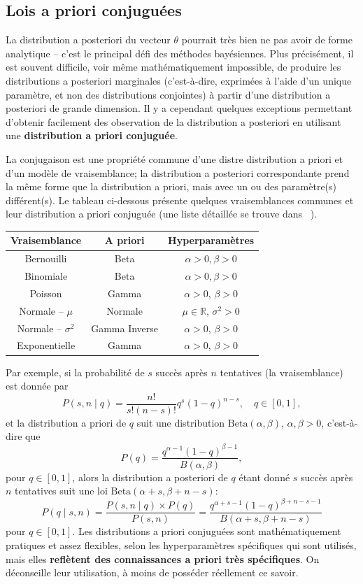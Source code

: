 \subsection{Lois a priori conjuguées}
La distribution a posteriori du vecteur $\theta$ pourrait tr\`es bien ne pas avoir de forme analytique -- c'est le principal défi des méthodes bayésiennes. \newl Plus précisément, il est souvent difficile, voir m\^eme math\'ematiquement impossible, de produire les distributions a posteriori marginales (c'est-\`a-dire, exprim\'ees \`a l'aide d'un unique param\`etre, et non des distributions conjointes) à partir d'une distribution a posteriori de grande dimension. \newpage\noindent Il y a cependant quelques exceptions permettant d'obtenir facilement des observation de la distribution a posteriori en utilisant une \textbf{distribution a priori conjuguée}. \par La conjugaison est une propriété commune d'une distre distribution a priori et d'un mod\`ele de vraisemblance; la distribution a posteriori correspondante prend la même forme que la distribution a priori, mais avec un ou des paramètre(s) différent(s). \newl Le tableau ci-dessous présente quelques vraisemblances communes et leur distribution a priori conjuguée (une liste d\'etaill\'ee se trouve dans ~\cite{BDA_N122}). 
\begin{center} 
\begin{tabular}{ccc} 
 \hline
  \textbf{Vraisemblance} & \textbf{A priori} & \textbf{Hyperparamètres} \\ \hline
 Bernouilli&Beta&$\alpha>0,\beta>0$
	\\  
 Binomiale&Beta&$\alpha>0,\beta>0$
	\\  
 Poisson&Gamma&$\alpha >0$, $\beta>0$
  \\  
 Normale -- $\mu$&Normale&$\mu\in\mathbb{R}$, $\sigma^{2}>0$
  \\  
 Normale -- $\sigma^{2}$&Gamma Inverse&$\alpha >0$, $\beta>0$
  \\  
 Exponentielle&Gamma&$\alpha >0$, $\beta>0$									
\\ \hline
\end{tabular}
\end{center}
Par exemple, si la probabilité de $s$ succès apr\`es $n$ tentatives (la vraisemblance) est donnée par $$P(s,n\mid q)=\frac{n!}{s!(n-s)!}q^s(1-q)^{n-s}, \quad q\in [0,1], $$ et la distribution a priori de $q$ suit une distribution $\text{Beta}(\alpha,\beta)$, $\alpha,\beta>0$, c'est-\`a-dire que $$P(q)=\frac{q^{\alpha-1}(1-q)^{\beta-1}}{B(\alpha,\beta)}, $$ pour $q\in [0,1]$, alors la distribution a posteriori de $q$ étant donné $s$ succès apr\`es $n$ tentatives suit une loi $\text{Beta}(\alpha+s,\beta+n-s)$: 
$$P(q\mid s,n)=\frac{P(s,n\mid q)\times P(q)}{P(s,n)}=\frac{q^{\alpha+s-1}(1-q)^{\beta+n-s-1}}{B(\alpha+s,\beta+n-s)}$$ pour $q\in [0,1]$. \newl 
Les distributions a priori conjuguées sont mathématiquement pratiques et assez flexibles, selon les hyperparamètres spécifiques qui sont utilis\'es, mais elles \textbf{reflètent des connaissances a priori très spécifiques}. On d\'econseille leur utilisation, à moins de posséder réellement ce savoir.

